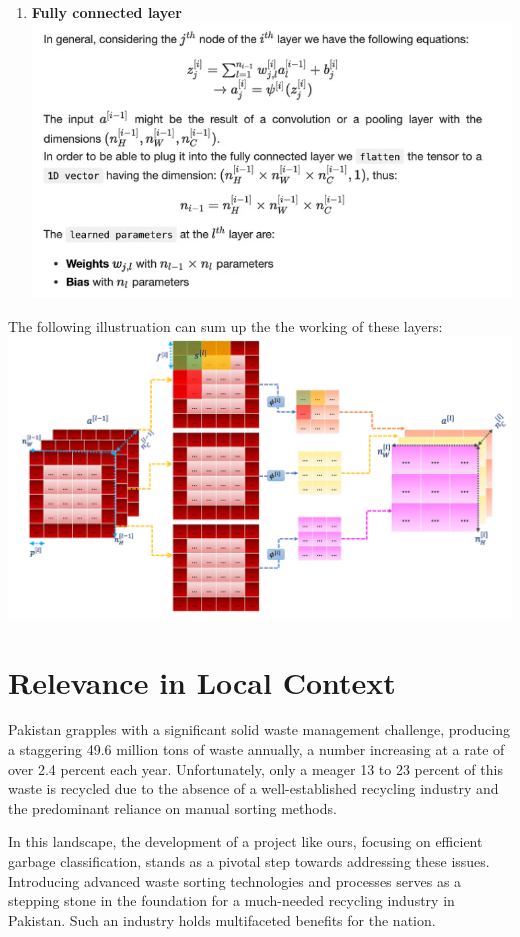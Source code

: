 \documentclass{article}
\begin{document}
\begin{enumerate}
    \item \textbf{Fully connected layer}
    \\ \includegraphics[scale = 0.69]{3rd.png}
\end{enumerate}
The following illustruation can sum up the the working of these layers:
\\ \includegraphics[scale = 0.55]{4th.png}    
\section{Relevance in Local Context}

Pakistan grapples with a significant solid waste management challenge, producing a staggering 49.6 million tons of waste annually, a number increasing at a rate of over 2.4 percent each year. Unfortunately, only a meager 13 to 23 percent of this waste is recycled due to the absence of a well-established recycling industry and the predominant reliance on manual sorting methods.

In this landscape, the development of a project like ours, focusing on efficient garbage classification, stands as a pivotal step towards addressing these issues. Introducing advanced waste sorting technologies and processes serves as a stepping stone in the foundation for a much-needed recycling industry in Pakistan. Such an industry holds multifaceted benefits for the nation.
\end{document}
